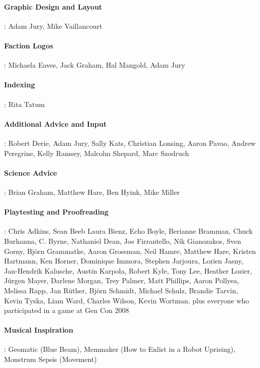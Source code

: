 \paragraph{Graphic Design and Layout}
\label{sec:graph-design-layo}
: Adam Jury, Mike Vaillancourt

\paragraph{Faction Logos}
\label{sec:faction-logos}
: Michaela Eaves, Jack Graham, Hal Mangold, Adam Jury

\paragraph{Indexing}
\label{sec:indexing}
: Rita Tatum

\paragraph{Additional Advice and Input}
\label{sec:addit-advice-input}
: Robert Derie, Adam Jury, Sally Kats, Christian Lonsing, Aaron Pavao,
Andrew Peregrine, Kelly Ramsey, Malcolm Shepard, Marc Szodruch

\paragraph{Science Advice}
\label{sec:science-advice}
: Brian Graham, Matthew Hare, Ben Hyink, Mike Miller

\paragraph{Playtesting and Proofreading}
\label{sec:playt-proofr}
: Chris Adkins, Sean Beeb Laura Bienz, Echo Boyle, Berianne Bramman,
Chuck Burhanna, C. Byrne, Nathaniel Dean, Joe Firrantello, Nik
Gianozakos, Sven Gorny, Björn Grammatke, Aaron Grossman, Neil Hamre,
Matthew Hare, Kristen Hartmann, Ken Horner, Dominique Immora, Stephen
Jarjoura, Lorien Jasny, Jan-Hendrik Kalusche, Austin Karpola, Robert
Kyle, Tony Lee, Heather Lozier, Jürgen Mayer, Darlene Morgan, Trey
Palmer, Matt Phillips, Aaron Pollyea, Melissa Rapp, Jan Rüther, Björn
Schmidt, Michael Schulz, Brandie Tarvin, Kevin Tyska, Liam Ward,
Charles Wilson, Kevin Wortman, plus everyone who participated in a
game at Gen Con 2008

\paragraph{Musical Inspiration}
\label{sec:musical-inspiration}
: Geomatic (Blue Beam), Memmaker (How to Enlist in a Robot Uprising),
Monstrum Sepsis (Movement)

